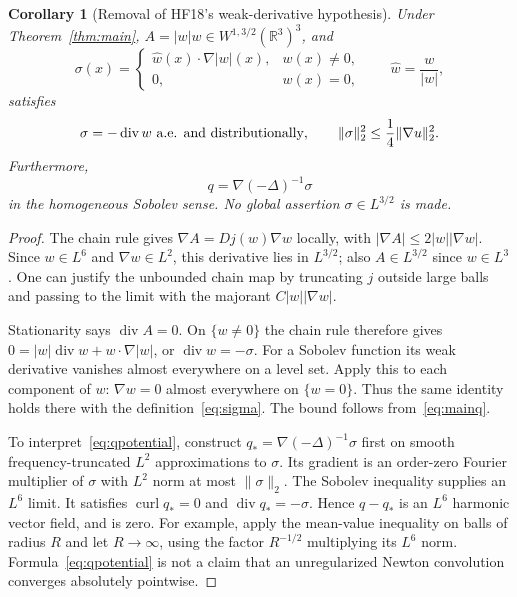 \documentclass[11pt,a4paper]{article}
\newtheorem{corollary}[theorem]{Corollary}
\theoremstyle{definition}
\newcommand{\R}{\mathbb R}
\DeclareMathOperator{\diver}{div}
\DeclareMathOperator{\curl}{curl}
\begin{document}
\begin{corollary}[Removal of HF18's weak-derivative hypothesis]\label{cor:sigma}
Under Theorem~\ref{thm:main}, $A=|w|w\in W^{1,3/2}(\R^3)^3$, and
\begin{equation}\label{eq:sigma}
 \sigma(x)=
 \begin{cases}
 \widehat w(x)\cdot\nabla|w|(x),&w(x)\ne0,\\
 0,&w(x)=0,
 \end{cases}
 \qquad \widehat w=\frac{w}{|w|},
\end{equation}
satisfies
\begin{equation}\label{eq:sigma-bound}
 \sigma=-\diver w\ \hbox{a.e. and distributionally},\qquad
 \|\sigma\|_2^2\le\frac14\|\nabla u\|_2^2.
\end{equation}
Furthermore,
\begin{equation}\label{eq:qpotential}
 q=\nabla(-\Delta)^{-1}\sigma
\end{equation}
in the homogeneous Sobolev sense. No global assertion $\sigma\in L^{3/2}$ is made.
\end{corollary}
\begin{proof}
The chain rule gives $\nabla A=Dj(w)\nabla w$ locally, with $|\nabla A|\le2|w||\nabla w|$. Since $w\in L^6$ and $\nabla w\in L^2$, this derivative lies in $L^{3/2}$; also $A\in L^{3/2}$ since $w\in L^3$. One can justify the unbounded chain map by truncating $j$ outside large balls and passing to the limit with the majorant $C|w||\nabla w|$.

Stationarity says $\diver A=0$. On $\{w\ne0\}$ the chain rule therefore gives
$0=|w|\diver w+w\cdot\nabla|w|$, or $\diver w=-\sigma$. For a Sobolev function its weak derivative vanishes almost everywhere on a level set. Apply this to each component of $w$: $\nabla w=0$ almost everywhere on $\{w=0\}$. Thus the same identity holds there with the definition~\eqref{eq:sigma}. The bound follows from~\eqref{eq:mainq}.

To interpret~\eqref{eq:qpotential}, construct $q_*=\nabla(-\Delta)^{-1}\sigma$ first on smooth frequency-truncated $L^2$ approximations to $\sigma$. Its gradient is an order-zero Fourier multiplier of $\sigma$ with $L^2$ norm at most $\|\sigma\|_2$. The Sobolev inequality supplies an $L^6$ limit. It satisfies $\curl q_*=0$ and $\diver q_*=-\sigma$. Hence $q-q_*$ is an $L^6$ harmonic vector field, and is zero. For example, apply the mean-value inequality on balls of radius $R$ and let $R\to\infty$, using the factor $R^{-1/2}$ multiplying its $L^6$ norm. Formula~\eqref{eq:qpotential} is not a claim that an unregularized Newton convolution converges absolutely pointwise.
\end{proof}
\end{document}
